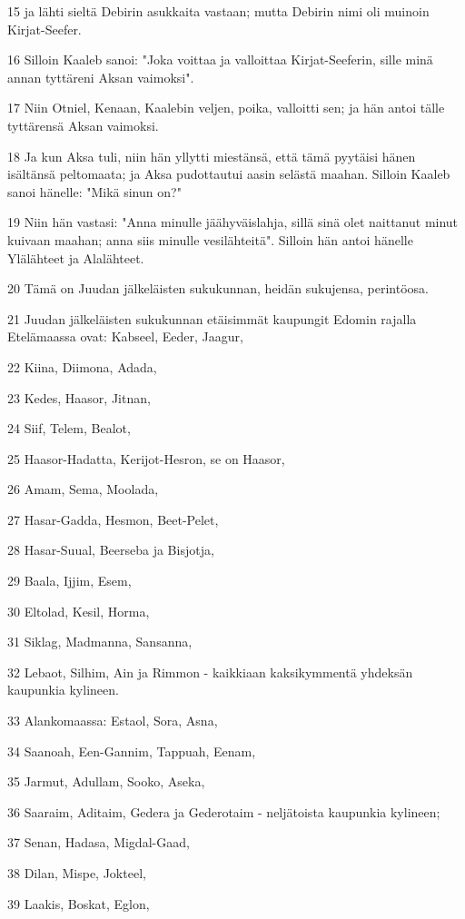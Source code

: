 \par 15 ja lähti sieltä Debirin asukkaita vastaan; mutta Debirin nimi oli muinoin Kirjat-Seefer.
\par 16 Silloin Kaaleb sanoi: "Joka voittaa ja valloittaa Kirjat-Seeferin, sille minä annan tyttäreni Aksan vaimoksi".
\par 17 Niin Otniel, Kenaan, Kaalebin veljen, poika, valloitti sen; ja hän antoi tälle tyttärensä Aksan vaimoksi.
\par 18 Ja kun Aksa tuli, niin hän yllytti miestänsä, että tämä pyytäisi hänen isältänsä peltomaata; ja Aksa pudottautui aasin selästä maahan. Silloin Kaaleb sanoi hänelle: "Mikä sinun on?"
\par 19 Niin hän vastasi: "Anna minulle jäähyväislahja, sillä sinä olet naittanut minut kuivaan maahan; anna siis minulle vesilähteitä". Silloin hän antoi hänelle Ylälähteet ja Alalähteet.
\par 20 Tämä on Juudan jälkeläisten sukukunnan, heidän sukujensa, perintöosa.
\par 21 Juudan jälkeläisten sukukunnan etäisimmät kaupungit Edomin rajalla Etelämaassa ovat: Kabseel, Eeder, Jaagur,
\par 22 Kiina, Diimona, Adada,
\par 23 Kedes, Haasor, Jitnan,
\par 24 Siif, Telem, Bealot,
\par 25 Haasor-Hadatta, Kerijot-Hesron, se on Haasor,
\par 26 Amam, Sema, Moolada,
\par 27 Hasar-Gadda, Hesmon, Beet-Pelet,
\par 28 Hasar-Suual, Beerseba ja Bisjotja,
\par 29 Baala, Ijjim, Esem,
\par 30 Eltolad, Kesil, Horma,
\par 31 Siklag, Madmanna, Sansanna,
\par 32 Lebaot, Silhim, Ain ja Rimmon - kaikkiaan kaksikymmentä yhdeksän kaupunkia kylineen.
\par 33 Alankomaassa: Estaol, Sora, Asna,
\par 34 Saanoah, Een-Gannim, Tappuah, Eenam,
\par 35 Jarmut, Adullam, Sooko, Aseka,
\par 36 Saaraim, Aditaim, Gedera ja Gederotaim - neljätoista kaupunkia kylineen;
\par 37 Senan, Hadasa, Migdal-Gaad,
\par 38 Dilan, Mispe, Jokteel,
\par 39 Laakis, Boskat, Eglon,
